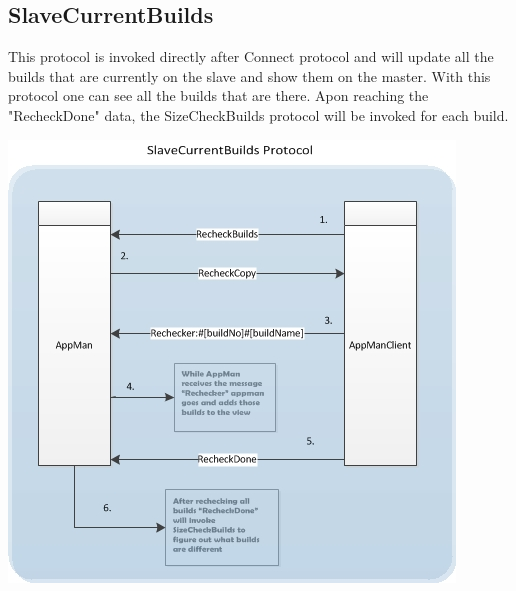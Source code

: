 \documentclass[a4paper,12pt,final]{article}
\begin{document}


\subsection{SlaveCurrentBuilds}
This protocol is invoked directly after Connect protocol and will update all the builds that are currently on the slave and show them on the master. With this protocol one can see all the builds that are there. Apon reaching the "RecheckDone" data, the SizeCheckBuilds protocol will be invoked for each build.
\begin{center}
\includegraphics[scale=1.0]{CommunicationProtocol/SlaveCurrentBuildsProtocol.jpg} 
\end{center}

\end{document}

